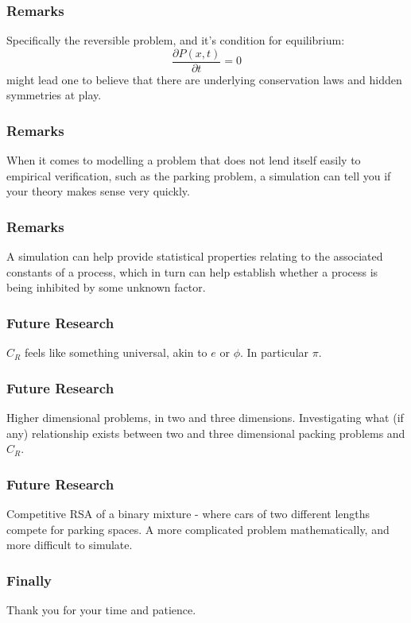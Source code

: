 \documentclass{beamer}
\begin{document}
\begin{frame}
	\frametitle{Remarks}
	Specifically the reversible problem, and it's condition for equilibrium:
	\[
		\frac{\partial P(x, t)}{\partial t} = 0
	\]
	might lead one to believe that there are underlying conservation laws and 
	hidden symmetries at play.
\end{frame}

\begin{frame}
	\frametitle{Remarks}
	When it comes to modelling a problem that does not lend itself easily to 
	empirical verification, such as the parking problem, a simulation can tell 
	you if your theory makes sense very quickly.
\end{frame}

\begin{frame}
	\frametitle{Remarks}
	A simulation can help provide statistical properties relating to the 
	associated constants of a process, which in turn can help establish 
	whether a process is being inhibited by some unknown factor.
\end{frame}

\begin{frame}
	\frametitle{Future Research}
	$C_R$ feels like something universal, akin to $e$ or $\phi$. In 
	particular $\pi$.
\end{frame}

\begin{frame}
	\frametitle{Future Research}
	Higher dimensional problems, in two and three dimensions. Investigating 
	what (if any) relationship exists between two and three dimensional 
	packing problems and $C_R$.
\end{frame}

\begin{frame}
	\frametitle{Future Research}
	Competitive RSA of a binary mixture - where cars of two different lengths 
	compete for parking spaces. A more complicated problem mathematically, and 
	more difficult to simulate.
\end{frame}

\begin{frame}
	\frametitle{Finally}
	Thank you for your time and patience.
\end{frame}
\end{document}
